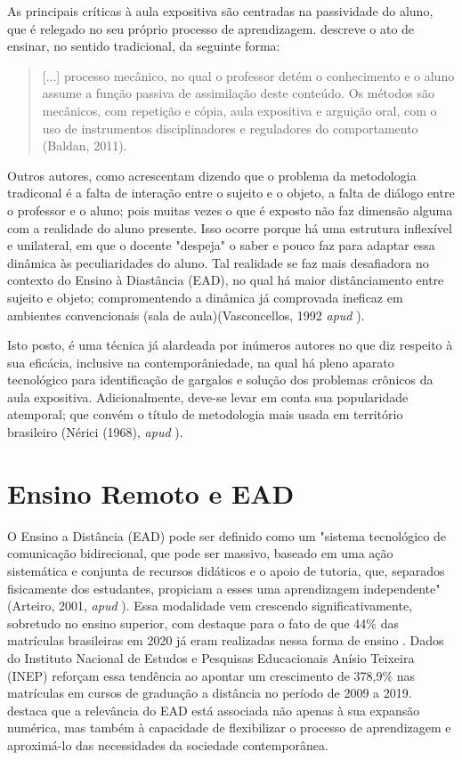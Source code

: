 As principais críticas à aula expositiva são centradas na passividade do aluno, que é relegado no seu próprio processo de aprendizagem. \cite{baldanRepresentacaoAtoEnsinar2011} descreve o ato de ensinar, no sentido tradicional, da seguinte forma:
\begin{quote}
    [...] processo mecânico, no qual o professor detém o conhecimento e o aluno assume a função passiva de assimilação deste conteúdo. Os métodos são mecânicos, com repetição e cópia, aula expositiva e arguição oral, com o uso de instrumentos disciplinadores e reguladores do comportamento (Baldan, 2011).
\end{quote}

Outros autores, como \cite{delimaCRITICAMETODOLOGIATRADICIONAL2022} acrescentam dizendo que o problema da metodologia tradiconal é a falta de interação entre o sujeito e o objeto, a falta de diálogo entre o professor e o aluno; pois muitas vezes o que é exposto não faz dimensão alguma com a realidade do aluno presente. Isso ocorre porque há uma estrutura inflexível e unilateral, em que o docente "despeja" o saber e pouco faz para adaptar essa dinâmica às peculiaridades do aluno. Tal realidade se faz mais desafiadora no contexto do Ensino à Diastância (EAD), no qual há maior distânciamento entre sujeito e objeto; compromentendo a dinâmica já comprovada ineficaz em ambientes convencionais (sala de aula)(Vasconcellos, 1992 \textit{apud} \cite{delimaCRITICAMETODOLOGIATRADICIONAL2022}).

Isto posto, é uma técnica já alardeada por inúmeros autores no que diz respeito à sua eficácia, inclusive na contemporâniedade, na qual há pleno aparato tecnológico para identificação de gargalos e solução dos problemas crônicos da aula expositiva. Adicionalmente, deve-se levar em conta sua popularidade atemporal; que convém o título de metodologia mais  usada em território brasileiro (Nérici (1968), \textit{apud} \cite{andreataAulaExpositivaPaulo2019}).

\section{Ensino Remoto e EAD}

O Ensino a Distância (EAD) pode ser definido como um "sistema tecnológico de comunicação bidirecional, que pode ser massivo, baseado em uma ação sistemática e conjunta de recursos didáticos e o apoio de tutoria, que, separados fisicamente dos estudantes, propiciam a esses uma aprendizagem independente" (Arteiro, 2001, \textit{apud} \cite{rochaMetodologiasAprendizagensNo2022}). Essa modalidade vem crescendo significativamente, sobretudo no ensino superior, com destaque para o fato de que 44\% das matrículas brasileiras em 2020 já eram realizadas nessa forma de ensino \cite{rochaMetodologiasAprendizagensNo2022}. Dados do Instituto Nacional de Estudos e Pesquisas Educacionais Anísio Teixeira (INEP) reforçam essa tendência ao apontar um crescimento de 378,9\% nas matrículas em cursos de graduação a distância no período de 2009 a 2019. \cite{moranEnsinoSuperiorDistancia2009} destaca que a relevância do EAD está associada não apenas à sua expansão numérica, mas também à capacidade de flexibilizar o processo de aprendizagem e aproximá-lo das necessidades da sociedade contemporânea.


